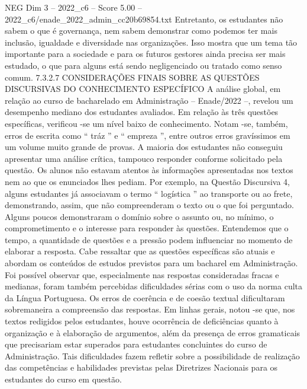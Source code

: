\begin{textsample}{NEG Dim 3 – 2022\_c6 – Score 5.00 – 2022\_c6/enade\_2022\_admin\_cc20b69854.txt}
Entretanto, os estudantes não sabem o que é governança, nem sabem demonstrar como podemos ter mais inclusão, igualdade e diversidade nas organizações.
Isso mostra que um tema tão importante para a sociedade e para os futuros gestores ainda precisa ser mais estudado, o que para alguns está sendo negligenciado ou tratado como senso comum. 7.3.2.7 CONSIDERAÇÕES FINAIS SOBRE AS QUESTÕES DISCURSIVAS DO CONHECIMENTO ESPECÍFICO A análise global, em relação ao curso de bacharelado em Administração – Enade/2022 –, revelou um desempenho mediano dos estudantes avaliados.
Em relação às três questões específicas, verificou -se um nível baixo de conhecimento.
Notam -se, também, erros de escrita como “ tráz ” e “ empreza ”, entre outros erros gravíssimos em um volume muito grande de provas.
A maioria dos estudantes não conseguiu apresentar uma análise crítica, tampouco responder conforme solicitado pela questão.
Os alunos não estavam atentos às informações apresentadas nos textos nem ao que os enunciados lhes pediam.
Por exemplo, na Questão Discursiva 4, alguns estudantes já associavam o termo “ logística ” ao transporte ou ao frete, demonstrando, assim, que não compreenderam o texto ou o que foi perguntado.
Alguns poucos demonstraram o domínio sobre o assunto ou, no mínimo, o comprometimento e o interesse para responder às questões.
Entendemos que o tempo, a quantidade de questões e a pressão podem influenciar no momento de elaborar a resposta.
Cabe ressaltar que as questões específicas são atuais e abordam os conteúdos de estudos previstos para um bacharel em Administração.
Foi possível observar que, especialmente nas respostas consideradas fracas e medianas, foram também percebidas dificuldades sérias com o uso da norma culta da Língua Portuguesa.
Os erros de coerência e de coesão textual dificultaram sobremaneira a compreensão das respostas.
Em linhas gerais, notou -se que, nos textos redigidos pelos estudantes, houve ocorrência de deficiências quanto à organização e à elaboração de argumentos, além da presença de erros gramaticais que precisariam estar superados para estudantes concluintes do curso de Administração.
Tais dificuldades fazem refletir sobre a possibilidade de realização das competências e habilidades previstas pelas Diretrizes Nacionais para os estudantes do curso em questão.

\end{textsample}
